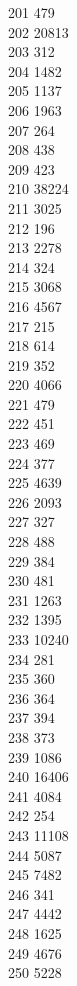 { 201	479 \\
 202	20813 \\
 203	312 \\
 204	1482 \\
 205	1137 \\
 206	1963 \\
 207	264 \\
 208	438 \\
 209	423 \\
 210	38224 \\
 211	3025 \\
 212	196 \\
 213	2278 \\
 214	324 \\
 215	3068 \\
 216	4567 \\
 217	215 \\
 218	614 \\
 219	352 \\
 220	4066 \\
 221	479 \\
 222	451 \\
 223	469 \\
 224	377 \\
 225	4639 \\
 226	2093 \\
 227	327 \\
 228	488 \\
 229	384 \\
 230	481 \\
 231	1263 \\
 232	1395 \\
 233	10240 \\
 234	281 \\
 235	360 \\
 236	364 \\
 237	394 \\
 238	373 \\
 239	1086 \\
 240	16406 \\
 241	4084 \\
 242	254 \\
 243	11108 \\
 244	5087 \\
 245	7482 \\
 246	341 \\
 247	4442 \\
 248	1625 \\
 249	4676 \\
 250	5228 \\
}
